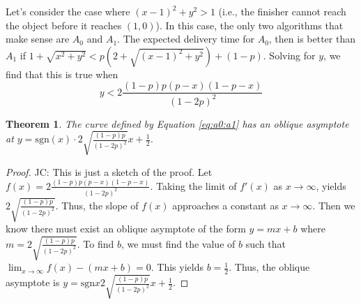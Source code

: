 \documentclass{article}
\newcommand\JC[1]{{\color{Maroon} JC: #1}}         %
\newtheorem{theorem}{Theorem}[section]
\begin{document}
Let's consider the case where $(x-1)^2 + y^2 > 1$ (i.e., the finisher cannot reach the object before it reaches $(1,0)$).
In this case, the only two algorithms that make sense are $A_0$ and $A_1$.
The expected delivery time for $A_0$, then is better than $A_1$ if $1 + \sqrt{x^2 + y^2} < p(2 + \sqrt{(x-1)^2 + y^2}) + (1-p)$.
Solving for $y$, we find that this is true when 
\begin{equation}
    y < 2 \frac{(1-p)p(p-x)(1-p-x)}{(1-2p)^2} \label{eq:a0:a1}
\end{equation}

\begin{theorem}
    The curve defined by Equation \ref{eq:a0:a1} has an oblique asymptote at $y = \text{sgn}(x) \cdot 2 \sqrt{\frac{(1-p)p}{(1-2p)^2}}x + \frac{1}{2}$.
\end{theorem}
\begin{proof}
    \JC{This is just a sketch of the proof.}
    Let $f(x) = 2 \frac{(1-p)p(p-x)(1-p-x)}{(1-2p)^2}$.
    Taking the limit of $f'(x)$ as $x \to \infty$, yields $2 \sqrt{\frac{(1-p)p}{(1-2p)^2}}$.
    Thus, the slope of $f(x)$ approaches a constant as $x \to \infty$.
    Then we know there must exist an oblique asymptote of the form $y = mx + b$ where $m = 2 \sqrt{\frac{(1-p)p}{(1-2p)^2}}$.
    To find $b$, we must find the value of $b$ such that $\lim_{x \to \infty} f(x) - (m x + b) = 0$.
    This yields $b = \frac{1}{2}$. Thus, the oblique asymptote is $y = \text{sgn}{x} 2 \sqrt{\frac{(1-p)p}{(1-2p)^2}}x + \frac{1}{2}$.
\end{proof}


\end{document}
